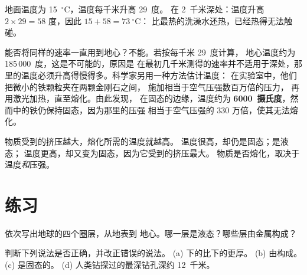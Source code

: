 \begin{example}[深两千米处]\label{ex:g6:inside-the-earth:two-km}
地面温度为 15~$^\circ$C，温度每千米升高 29~度。
在 2~千米深处：温度升高 $2 \times 29 = 58$ 度，因此 $15 + 58 = 73~^\circ$C：
比最热的洗澡水还热，已经热得无法触碰。
\end{example}

能否将同样的速率一直用到地心？不能。若按每千米 29~度计算，
地心温度约为 185\,000~度，这是不可能的，原因是
在最初几千米测得的速率并不适用于深处，那里的温度必须升高得慢得多。科学家另用一种方法估计温度：
在实验室中，他们把微小的铁颗粒夹在两颗金刚石之间，
施加相当于空气压强数百万倍的压力，
再用激光加热，直至熔化。由此发现，
在固态的边缘，温度约为
\textbf{6000~摄氏度}，然而中的铁仍保持固态，因为那里的压强
相当于空气压强的 330 万倍，使其无法熔化。

\begin{remark}[热而仍为固态]\label{rem:g6:inside-the-earth:pressure}
物质受到的挤压越大，熔化所需的温度就越高。
温度很高，却仍是固态；是液态；
温度更高，却又变为固态，因为它受到的挤压最大。
物质是否熔化，取决于温度\emph{和}压强。
\end{remark}

\section{练习}

\begin{exercise}[$\star$]\label{exo:g6:inside-the-earth:1}
依次写出地球的四个圈层，从地表到
地心。哪一层是液态？哪些层由金属构成？
\end{exercise}

\begin{exercise}[$\star$]\label{exo:g6:inside-the-earth:2}
判断下列说法是否正确，并改正错误的说法。
(a) 下的比下的更厚。
(b) 由构成。
(c) 是固态的。
(d) 人类钻探过的最深钻孔深约 12~千米。
\end{exercise}

